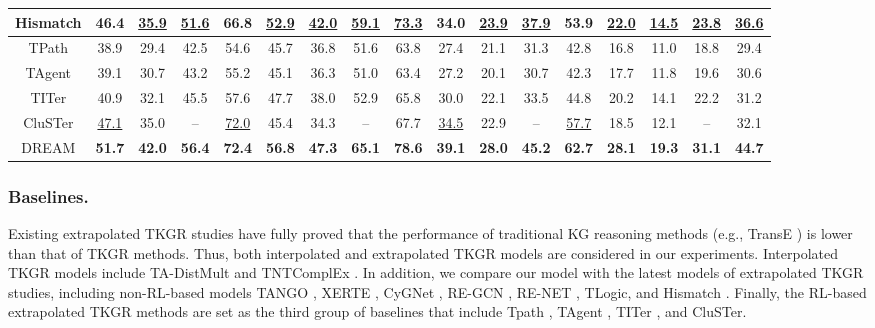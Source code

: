 \documentclass[sigconf,natbib=true]{acmart}
\begin{document}
\begin{table}
{\begin{tabular}{c|cccc|cccc|cccc|cccc}
            Hismatch    & 46.4  & {\underline {35.9}} & {\underline {51.6}}  & 66.8& {\underline {52.9}}  & {\underline {42.0}} & {\underline {59.1}} & {\underline {73.3}}& 34.0 & {\underline {23.9}} & {\underline {37.9}} & 53.9 & {\underline {22.0}}& {\underline {14.5}}& {\underline {23.8}} & {\underline {36.6}}\\
      	
              
        \midrule
          TPath   & 38.9     &29.4 & 42.5  & 54.6 &45.7 & 36.8 &51.6 & 63.8& 27.4  & 21.1& 31.3 &42.8 & 16.8  & 11.0 & 18.8 & 29.4 \\
          TAgent   &39.1     & 30.7 & 43.2 & 55.2 & 45.1 & 36.3 & 51.0  & 63.4 & 27.2    & 20.1 & 30.7  & 42.3 & 17.7  & 11.8 & 19.6  &30.6\\
          TITer  & 40.9   & 32.1 & 45.5  & 57.6 & 47.7 & 38.0 & 52.9& 65.8& 30.0& 22.1& 33.5 & 44.8& 20.2& 14.1& 22.2 & 31.2\\
         CluSTer  & {\underline {47.1}}   & 35.0 & --  & {\underline {72.0}} & 45.4 & 34.3 & --& 67.7 & {\underline {34.5}}& 22.9& -- & {\underline {57.7}}& 18.5& 12.1& -- & 32.1\\
		\bottomrule
	DREAM & \textbf{51.7} & \textbf{42.0} & \textbf{56.4}  & \textbf{72.4} & \textbf{56.8}  & \textbf{47.3} & \textbf{65.1}  & \textbf{78.6} & \textbf{39.1}   & \textbf{28.0} & \textbf{45.2}  & \textbf{62.7} & \textbf{28.1}  & \textbf{19.3} & \textbf{31.1} & \textbf{44.7} \\
			\bottomrule
		\end{tabular}
	}
	\label{tab:whoiswho}
	\vspace{-3pt}
\end{table}





\subsubsection{Baselines.}
Existing extrapolated TKGR studies \cite{XERTE, RE-GCN, TiTer} have fully proved that the performance of  traditional KG reasoning methods  (e.g., TransE \cite{TransE}) is lower than that of TKGR methods. Thus,  both interpolated and extrapolated TKGR models are considered in our experiments. Interpolated TKGR models include  TA-DistMult \cite{TA-transE} and TNTComplEx \cite{TNTComplEx}. In addition, we compare our model with the latest models of extrapolated TKGR studies, including non-RL-based models TANGO \cite{TANGO}, XERTE \cite{XERTE}, CyGNet \cite{CyGNet}, RE-GCN \cite{RE-GCN}, RE-NET \cite{RE-NET}, TLogic\cite{TLogic},  and Hismatch \cite{HiSMatch}. Finally, the RL-based extrapolated TKGR methods are set as the third group of baselines that include Tpath \cite{TPath}, TAgent \cite{TAgent}, TITer \cite{TiTer}, and CluSTer\cite{Cluster}.
\end{document}
